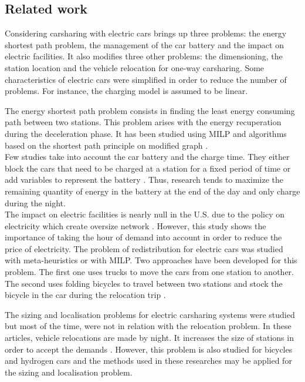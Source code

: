 \begin{bibunit}[ieeetr]
\subsection{Related work}


Considering carsharing with electric cars brings up three problems: the energy shortest path problem, the management of the car battery and the impact on electric facilities.
It also modifies three other problems: the dimensioning, the station location and the vehicle relocation for one-way carsharing.
Some characteristics of electric cars were simplified in order to reduce the number of problems.
For instance, the charging model is assumed to be linear.


\medskip
The energy shortest path problem consists in finding the least energy consuming path between two stations.
This problem arises with the energy recuperation during the deceleration phase.
It has been studied using MILP \cite{touati_combinatorial_2012} and algorithms based on the shortest path principle on modified graph \cite{artmeier_optimal_2010}.\\
Few studies take into account the car battery and the charge time.
They either block the cars that need to be charged at a station for a fixed period of time \cite{boyaci_optimization_2015} or add variables to represent the battery \cite{bruglieri_vehicle_2014}.
Thus, research tends to maximize the remaining quantity of energy in the battery at the end of the day and only charge during the night.\\
The impact on electric facilities is nearly null in the U.S. due to the policy on electricity which create oversize network \cite{liu_survey_2011}.
However, this study shows the importance of taking the hour of demand into account in order to reduce the price of electricity. 
The problem of redistribution for electric cars was studied with meta-heuristics or with MILP.
Two approaches have been developed for this problem.
The first one uses trucks to move the cars from one station to another.
The second uses folding bicycles to travel between two stations and stock the bicycle in the car during the relocation trip \cite{bruglieri_vehicle_2014}.


\medskip
The sizing and localisation problems for electric carsharing systems were studied but most of the time, were not in relation with the relocation problem.
In these articles, vehicle relocations are made by night.
It increases the size of stations in order to accept the demands \cite{correia_optimization_2012}.
However, this problem is also studied for bicycles \cite{george_fleet_2011} and hydrogen cars \cite{melaina_initiating_2003} and the methods used in these researches may be applied for the sizing and localisation problem.



\end{bibunit}
